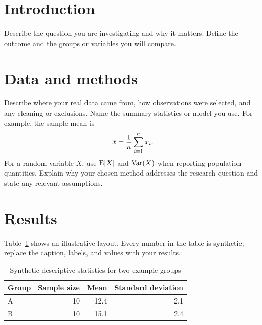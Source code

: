 \documentclass[11pt]{article}
\title{\ReportTitle}
\author{\StudentName \\ \CourseName \\ \InstitutionName}
\date{\SubmissionDate}
\begin{document}
\maketitle

\begin{abstract}
State the research question, data source, method, and main finding in a few sentences. The values in this sample are synthetic and demonstrate formatting only.
\end{abstract}

\section{Introduction}
Describe the question you are investigating and why it matters. Define the outcome and the groups or variables you will compare.

\section{Data and methods}
Describe where your real data came from, how observations were selected, and any cleaning or exclusions. Name the summary statistics or model you use. For example, the sample mean is
\begin{equation}
  \overline{x} = \frac{1}{n}\sum_{i=1}^{n} x_i.
  \label{eq:mean}
\end{equation}
For a random variable $X$, use $\operatorname{E}\!\left[X\right]$ and $\operatorname{Var}\!\left(X\right)$ when reporting population quantities. Explain why your chosen method addresses the research question and state any relevant assumptions.

\section{Results}
Table~\ref{tab:summary} shows an illustrative layout. Every number in the table is synthetic; replace the caption, labels, and values with your results.

\begin{table}[htbp]
  \centering
  \caption{Synthetic descriptive statistics for two example groups}
  \label{tab:summary}
  \begin{tabular}{lrrr}
    \toprule
    Group & Sample size & Mean & Standard deviation \\
    \midrule
    A & 10 & 12.4 & 2.1 \\
    B & 10 & 15.1 & 2.4 \\
    \bottomrule
  \end{tabular}
\end{table}
\end{document}
